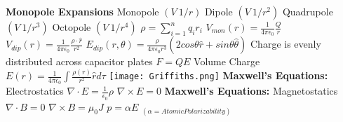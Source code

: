 \documentclass[1pt]{report}
\begin{document}
\begin{multicols}{3}
\begin{flushleft}
\begin{comment}
\linebreak
$ \int_0^a V_0(y) \sin \left(\frac{n' \pi y}{a} \right) \, dy = \sum_{n=1}^{\infty} C_n \int_0^a  \sin \left(\frac{n \pi y}{a} \right)\sin \left(\frac{n' \pi y}{a} \right) \, dy = \frac{a}{2} C_{n'}$
\linebreak
$C_{n'} = \frac{2}{a} \int_0^a V_0(y) \sin \left(\frac{n' \pi y}{a} \right) \, dy$
\linebreak
\textbf{Legendre Polynomials}
\linebreak
$P_0(x) = 1$
\linebreak
$P_1(x) = x$
\linebreak
$P_2(x) = \frac{1}{2}(3x^2 - 1)$
\linebreak
$P_3(x) = \frac{1}{2}(5x^3-3x)$
\linebreak
$V(r,\theta)=\sum_{l=0}^{\infty}(A_lr^l+\frac{B^l}{R^{l+1}})P_l(cos\theta)$
\end{comment}
\textbf{Monopole Expansions}
\linebreak
Monopole $(V~1/r)$
\linebreak
Dipole $(V~1/r^2)$
\linebreak
Quadrupole $(V~1/r^3)$
\linebreak
Octopole $(V~1/r^4)$
\linebreak
$\rho=\sum_{i=1}^{n}q_ir_i$
\linebreak
$V_{mon}(r)=\frac{1}{4\pi\epsilon_0}\frac{Q}{r}$
\linebreak
$V_{dip}(r)=\frac{1}{4\pi\epsilon_0}\frac{\rho\cdot\hat{r}}{r^2}$
\linebreak
$E_{dip}(r,\theta)=\frac{\rho}{4\pi\epsilon_0r^3}(2cos\theta\hat{r}+sin\theta\hat{\theta})$
\linebreak
Charge is evenly distributed across capacitor plates
\linebreak
$F=QE$
\linebreak
Volume Charge
$E(r)=\frac{1}{4\pi\epsilon_0}\int\frac{\rho(r)}{r^2}\hat{r}d\tau$
\linebreak
\texttt{[image: Griffiths.png]}
\linebreak
\textbf{Maxwell's Equations:} Electrostatics
$\nabla\cdot E=\frac{1}{\epsilon_0}\rho$
\linebreak
$\nabla\times E=0$
\linebreak
\textbf{Maxwell's Equations:} Magnetostatics
$\nabla\cdot B=0$
\linebreak
$\nabla\times B=\mu_0J$
\linebreak
$p=\alpha E$ $_{(\alpha=Atomic Polarizability)}$
\linebreak

\end{flushleft}
\end{multicols}
\end{document}

